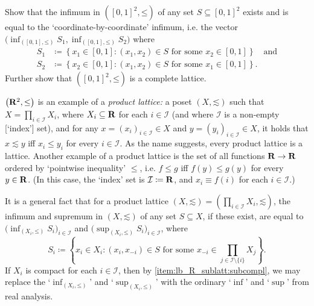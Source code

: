 \begin{namedthm}
	\label{exercise:lb-R2_lat_a-d}
	Show that the infimum in $\left( [0,1]^2, \mathord{\leq} \right)$ of any set $S \subseteq [0,1]^2$ exists and is equal to the `coordinate-by-coordinate' infimum, i.e. the vector $\bigl( \inf_{([0,1],\mathord{\leq})} S_1, \inf_{([0,1],\mathord{\leq})} S_2 \bigr)$ where
	\begin{align*}
		S_1 &\coloneqq \left\{ x_1 \in [0,1] : \text{$(x_1,x_2) \in S$ for some $x_2 \in [0,1]$} \right\}
		\quad \text{and}
		\\
		S_2 &\coloneqq \left\{ x_2 \in [0,1] : \text{$(x_1,x_2) \in S$ for some $x_1 \in [0,1]$} \right\} .
	\end{align*}
	Further show that $\left( [0,1]^2, \mathord{\leq} \right)$ is a complete lattice.
\end{namedthm}

$\left( \R^2, \mathord{\leq} \right)$ is an example of a \emph{product lattice:} a poset $(X,\mathord{\lesssim})$ such that $X = \prod_{i \in \mathcal{I}} X_i$, where $X_i \subseteq \mathbf{R}$ for each $i \in \mathcal{I}$ (and where $\mathcal{I}$ is a non-empty [`index'] set), and for any $x = (x_i)_{i \in \mathcal{I}} \in X$ and $y = (y_i)_{i \in \mathcal{I}} \in X$, it holds that $x \lesssim y$ iff $x_i \leq y_i$ for every $i \in \mathcal{I}$. As the name suggests, every product lattice is a lattice. Another example of a product lattice is the set of all functions $\mathbf{R} \to \mathbf{R}$ ordered by `pointwise inequality' $\leq$, i.e. $f \leq g$ iff $f(y) \leq g(y)$ for every $y \in \mathbf{R}$. (In this case, the `index' set is $\mathcal{I} \coloneqq \mathbf{R}$, and $x_i \equiv f(i)$ for each $i \in \mathcal{I}$.)

It is a general fact that for a product lattice $(X,\mathord{\lesssim}) = \left( \prod_{i \in \mathcal{I}} X_i, \mathord{\lesssim} \right)$, the infimum and supremum in $(X,\mathord{\lesssim})$ of any set $S \subseteq X$, if these exist, are equal to $\bigl( \inf_{(X_i,\mathord{\leq})} S_i \bigr)_{i \in \mathcal{I}}$ and $\bigl( \sup_{(X_i,\mathord{\leq})} S_i \bigr)_{i \in \mathcal{I}}$, where
%
\begin{equation*}
	S_i \coloneqq \left\{ x_i \in X_i : \text{$(x_i,x_{-i}) \in S$ for some $x_{-i} \in \prod_{j \in \mathcal{I} \setminus \{i\}} X_j$} \right\} .
\end{equation*}
%
If $X_i$ is compact for each $i \in \mathcal{I}$, then by \ref{item:lb_R_sublatt:subcompl}, we may replace the `$\inf_{(X_i,\mathord{\leq})}$' and `$\sup_{(X_i,\mathord{\leq})}$' with the ordinary `$\inf$' and `$\sup$' from real analysis.

